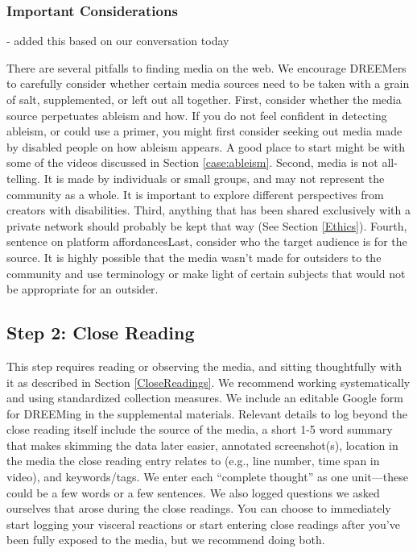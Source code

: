 {\color{red}\subsubsection{Important Considerations }- added this based on our conversation today}
There are several pitfalls to finding media on the web. We encourage DREEMers to carefully consider whether certain media sources need to be taken with a grain of salt, supplemented, or left out all together. First, consider whether the media source perpetuates ableism and how. If you do not feel confident in detecting ableism, or could use a primer, you might first consider seeking out media made by disabled people on how ableism appears. A good place to start might be with some of the videos discussed in Section \ref{case:ableism}. Second, media is not all-telling. It is made by individuals or small groups, and may not represent the community as a whole. It is important to explore different perspectives from creators with disabilities. Third, anything that has been shared exclusively with a private network should probably be kept that way (See Section \ref{Ethics}). Fourth, {\color{red}sentence on platform affordances}Last, consider who the target audience is for the source. It is highly possible that the media wasn't made for outsiders to the community and use terminology or make light of certain subjects that would not be appropriate for an outsider.  



\subsection{Step 2: Close Reading}
This step requires reading or observing the media, and sitting thoughtfully with it as described in Section \ref{CloseReadings}. We recommend working systematically and using standardized collection measures. We include an editable Google form for DREEMing in the supplemental materials. Relevant details to log beyond the close reading itself include the source of the media, a short 1-5 word summary that makes skimming the data later easier, annotated screenshot(s), location in the media the close reading entry relates to (e.g., line number, time span in video), and keywords/tags. We enter each ``complete thought'' as one unit—these could be a few words or a few sentences. We also logged questions we asked ourselves that arose during the close readings. You can choose to immediately start logging your visceral reactions or start entering close readings after you've been fully exposed to the media, but we recommend doing both.

